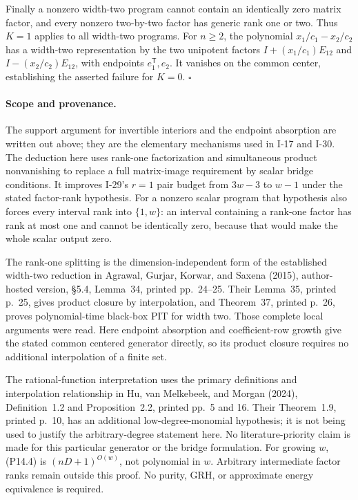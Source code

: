 Finally a nonzero width-two program cannot contain an
identically zero matrix factor, and every nonzero two-by-two
factor has generic rank one or two. Thus $K=1$ applies to
all width-two programs. For $n\geq2$, the polynomial
$x_1/c_1-x_2/c_2$ has a width-two representation by the two
unipotent factors $I+(x_1/c_1)E_{12}$ and
$I-(x_2/c_2)E_{12}$, with endpoints $e_1^{\mathsf T},e_2$.
It vanishes on the common center, establishing the asserted
failure for $K=0$. $\square$

\paragraph{Scope and provenance.}
The support argument for invertible interiors and the endpoint
absorption are written out above; they are the elementary
mechanisms used in I-17 and I-30. The deduction here uses
rank-one factorization and simultaneous product nonvanishing
to replace a full matrix-image requirement by scalar bridge
conditions. It improves I-29's $r=1$ pair budget from $3w-3$
to $w-1$ under the stated factor-rank hypothesis. For a
nonzero scalar program that hypothesis also forces every
interval rank into $\{1,w\}$: an interval containing a rank-one
factor has rank at most one and cannot be identically zero,
because that would make the whole scalar output zero.

The rank-one splitting is the dimension-independent form of
the established width-two reduction in Agrawal, Gurjar,
Korwar, and Saxena (2015), author-hosted version,
\S5.4, Lemma~34, printed pp.~24--25. Their Lemma~35,
printed p.~25, gives product closure by interpolation, and
Theorem~37, printed p.~26, proves polynomial-time black-box
PIT for width two. Those complete local arguments were read.
Here endpoint absorption and coefficient-row growth give the
stated common centered generator directly, so its product
closure requires no additional interpolation of a finite set.

The rational-function interpretation uses the primary
definitions and interpolation relationship in Hu, van
Melkebeek, and Morgan (2024), Definition~1.2 and
Proposition~2.2, printed pp.~5 and 16. Their Theorem~1.9,
printed p.~10, has an additional low-degree-monomial
hypothesis; it is not being used to justify the arbitrary-degree
statement here. No literature-priority claim is made for
this particular generator or the bridge formulation.
For growing $w$, (P14.4) is $(nD+1)^{O(w)}$, not polynomial
in $w$. Arbitrary intermediate factor ranks remain outside
this proof. No purity, GRH, or approximate energy equivalence
is required.


